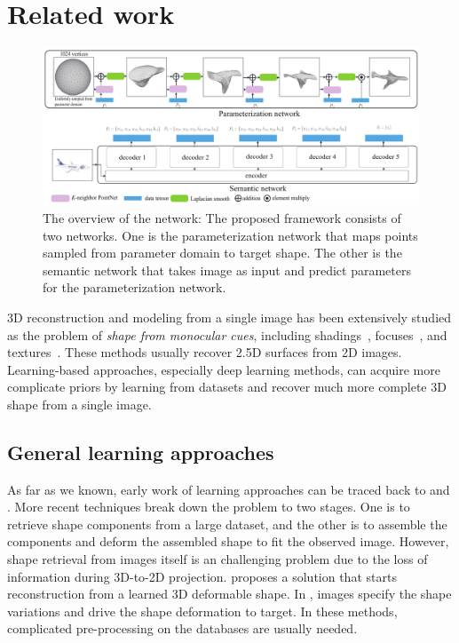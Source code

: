 \section{Related work}
\begin{figure}[htbp]
	\centering
	\includegraphics[width=\linewidth]{img/net/overview}
	\caption{The overview of the network: The proposed framework consists of two networks. One is the parameterization network that maps points sampled from parameter domain to target shape. The other is the semantic network that takes image as input and predict parameters for the parameterization network. }
	\label{fig:overview}
\end{figure}

3D reconstruction and modeling from a single image has been extensively studied as the problem of \emph{shape from monocular cues}, including shadings~\cite{shapefromshadingsurvey}, focuses~\cite{shapefromdf1,shapefromdf2}, and textures~\cite{Aloimonos1988}. 
These methods usually recover 2.5D surfaces from 2D images. 
Learning-based approaches, especially deep learning methods, can acquire more complicate priors by learning from datasets and recover much more complete 3D shape from a single image.
 
\subsection{General learning approaches}
As far as we known, early work of learning approaches can be traced back to \cite{Hoiem2007} and \cite{learn3D2007}. 
%
More recent techniques break down the problem to two stages\cite{Su:2014,jointimgshape}. One is to retrieve shape components from a large dataset, and the other is to assemble the components and deform the assembled shape to fit the observed image. 
%
However, shape retrieval from images itself is an challenging problem due to the loss of information during 3D-to-2D projection. 
\cite{imgrecon15} proposes a solution that starts reconstruction from a learned 3D deformable shape. 
In \cite{imgrecon15}, images specify the shape variations and drive the shape deformation to target.
%
In these methods, complicated pre-processing on the databases are usually needed.

